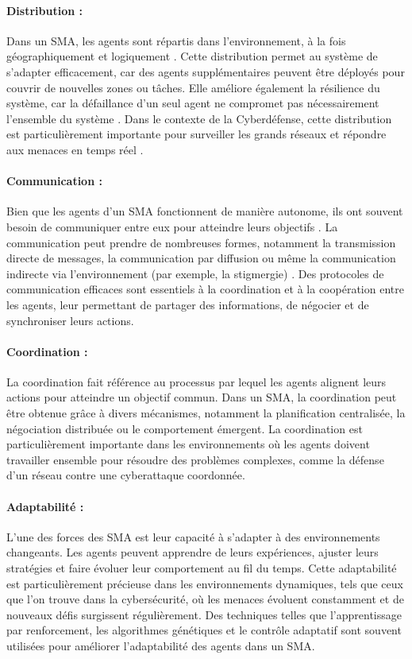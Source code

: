 \paragraph{Distribution :}
Dans un SMA, les agents sont répartis dans l'environnement, à la fois géographiquement et logiquement \cite{ferber1999multi}. Cette distribution permet au système de s'adapter efficacement, car des agents supplémentaires peuvent être déployés pour couvrir de nouvelles zones ou tâches. Elle améliore également la résilience du système, car la défaillance d'un seul agent ne compromet pas nécessairement l'ensemble du système \cite{durfee1999distributed}. Dans le contexte de la Cyberdéfense, cette distribution est particulièrement importante pour surveiller les grands réseaux et répondre aux menaces en temps réel \cite{shakarian2015cyber}.

\paragraph{Communication :}
Bien que les agents d'un SMA fonctionnent de manière autonome, ils ont souvent besoin de communiquer entre eux pour atteindre leurs objectifs \cite{huhns1999multiagent}. La communication peut prendre de nombreuses formes, notamment la transmission directe de messages, la communication par diffusion ou même la communication indirecte via l'environnement (par exemple, la stigmergie) \cite{dorigo2000ant}. Des protocoles de communication efficaces sont essentiels à la coordination et à la coopération entre les agents, leur permettant de partager des informations, de négocier et de synchroniser leurs actions.

\paragraph{Coordination :}
La coordination fait référence au processus par lequel les agents alignent leurs actions pour atteindre un objectif commun. Dans un SMA, la coordination peut être obtenue grâce à divers mécanismes, notamment la planification centralisée, la négociation distribuée ou le comportement émergent. La coordination est particulièrement importante dans les environnements où les agents doivent travailler ensemble pour résoudre des problèmes complexes, comme la défense d'un réseau contre une cyberattaque coordonnée.

\paragraph{Adaptabilité :}
L’une des forces des SMA est leur capacité à s’adapter à des environnements changeants. Les agents peuvent apprendre de leurs expériences, ajuster leurs stratégies et faire évoluer leur comportement au fil du temps. Cette adaptabilité est particulièrement précieuse dans les environnements dynamiques, tels que ceux que l’on trouve dans la cybersécurité, où les menaces évoluent constamment et de nouveaux défis surgissent régulièrement. Des techniques telles que l’apprentissage par renforcement, les algorithmes génétiques et le contrôle adaptatif sont souvent utilisées pour améliorer l’adaptabilité des agents dans un SMA.

